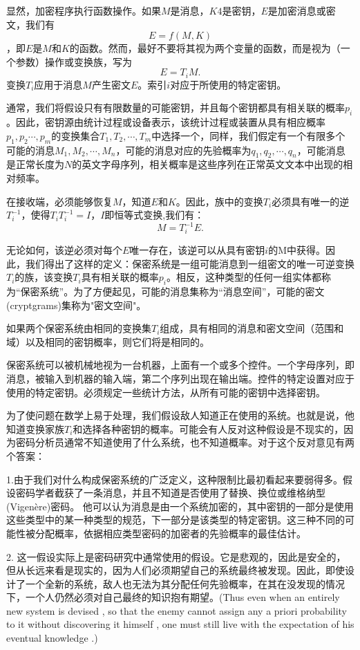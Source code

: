 \documentclass[]{article}
\begin{document}
显然，加密程序执行函数操作。如果$M$是消息，$K4$是密钥，$E$是加密消息或密文，我们有\[E=f(M,K)\]，即$E$是$M$和$K$的函数。然而，最好不要将其视为两个变量的函数，而是视为（一个参数）操作或变换族，写为\[E=T_iM.\]
变换$T_i$应用于消息$M$产生密文$E$。索引$i$对应于所使用的特定密钥。

通常，我们将假设只有有限数量的可能密钥，并且每个密钥都具有相关联的概率$p_i$。因此，密钥源由统计过程或设备表示，该统计过程或装置从具有相应概率$p_1,p_2\cdots,p_m$的变换集合$T_1,T_2,\cdots,T_m$中选择一个，同样，我们假定有一个有限多个可能的消息$M_1,M_2,\cdots,M_n$，可能的消息对应的先验概率为$q_1,q_2,\cdots,q_n$，可能消息是正常长度为$N$的英文字母序列，相关概率是这些序列在正常英文文本中出现的相对频率。

在接收端，必须能够恢复$M$，知道$E$和$K$。因此，族中的变换$T_i$必须具有唯一的逆$T^{-1}_i$，使得$T_iT^{-1}_i=I$，$I$即恒等式变换,我们有：\[M=T^{-1}_i E.\]

无论如何，该逆必须对每个$E$唯一存在，该逆可以从具有密钥$i$的M中获得。因此，我们得出了这样的定义：保密系统是一组可能消息到一组密文的唯一可逆变换$T_i$的族，该变换$T_i$具有相关联的概率$p_i$。相反，这种类型的任何一组实体都称为“保密系统”。为了方便起见，可能的消息集称为“消息空间”，可能的密文(cryptgrams)集称为"密文空间"。

如果两个保密系统由相同的变换集$T_i$组成，具有相同的消息和密文空间（范围和域）以及相同的密钥概率，则它们将是相同的。

保密系统可以被机械地视为一台机器，上面有一个或多个控件。一个字母序列，即消息，被输入到机器的输入端，第二个序列出现在输出端。控件的特定设置对应于使用的特定密钥。必须规定一些统计方法，从所有可能的密钥中选择密钥。

为了使问题在数学上易于处理，我们假设敌人知道正在使用的系统。也就是说，他知道变换家族$T_i$和选择各种密钥的概率。可能会有人反对这种假设是不现实的，因为密码分析员通常不知道使用了什么系统，也不知道概率。对于这个反对意见有两个答案：

1.由于我们对什么构成保密系统的广泛定义，这种限制比最初看起来要弱得多。假设密码学者截获了一条消息，并且不知道是否使用了替换、换位或维格纳型(Vigen\`{e}re)密码。 他可以认为消息是由一个系统加密的，其中密钥的一部分是使用这些类型中的某一种类型的规范，下一部分是该类型的特定密钥。这三种不同的可能性被分配概率，依据相应类型密码的加密者的先验概率的最佳估计。


2. 这一假设实际上是密码研究中通常使用的假设。它是悲观的，因此是安全的，但从长远来看是现实的，因为人们必须期望自己的系统最终被发现。因此，即使设计了一个全新的系统，敌人也无法为其分配任何先验概率，在其在没发现的情况下，一个人仍然必须对自己最终的知识抱有期望。(Thus even when an entirely new system is devised , so that the enemy cannot assign any a priori probability to it without discovering it himself , one must still live with the expectation of his eventual knowledge .)
\end{document}
